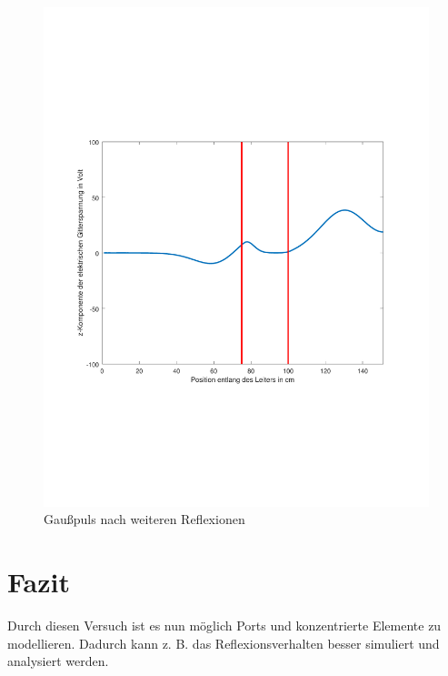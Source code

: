 \documentclass[Protokollheft.tex]{subfiles}
\begin{document}
\begin{figure}[ht]
	\centering
	\includegraphics[trim = 15mm 65mm 20mm 65mm, clip,width=0.7\linewidth]{untitledG3.pdf}
	\caption{Gaußpuls nach weiteren Reflexionen}\label{fig:inh6}
\end{figure} 






\section{Fazit}
Durch diesen Versuch ist es nun möglich Ports und konzentrierte Elemente zu modellieren. Dadurch kann z. B. das Reflexionsverhalten besser simuliert und analysiert werden.
\end{document}
